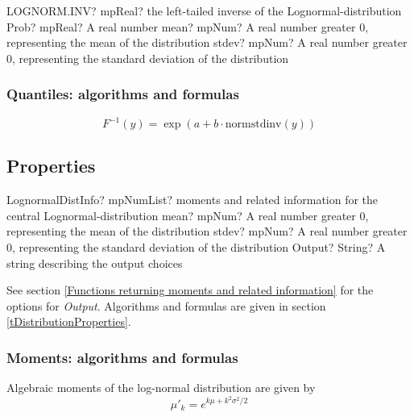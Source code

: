 \vspace{0.6cm}
\begin{mpFunctionsExtract}
	\mpWorksheetFunctionThreeNotImplemented
	{LOGNORM.INV? mpReal? the left-tailed inverse of the Lognormal-distribution}
	{Prob? mpReal? A real number}
	{mean? mpNum? A real number greater 0, representing the mean of the distribution}
	{stdev? mpNum? A real number greater 0, representing the standard deviation of the distribution}
\end{mpFunctionsExtract}


\subsubsection{Quantiles: algorithms and formulas}

\begin{equation} 
	F^{-1}(y)= \exp(a+b \cdot \text{normstdinv}(y))
\end{equation}



\subsection{Properties}
\label{LognormalDistributionProperties}


\begin{mpFunctionsExtract}
	\mpFunctionThreeNotImplemented
	{LognormalDistInfo? mpNumList? moments and related information for the central Lognormal-distribution}
	{mean? mpNum? A real number greater 0, representing the mean of the distribution}
	{stdev? mpNum? A real number greater 0, representing the standard deviation of the distribution}
	{Output? String? A string describing the output choices}
\end{mpFunctionsExtract}

\vspace{0.3cm}

See section \ref{Functions returning moments and related information} for the options for {\itshape\sffamily Output}. Algorithms and formulas are given in section \ref{tDistributionProperties}.




\subsubsection{Moments: algorithms and formulas}
Algebraic moments of the log-normal distribution are given by
\begin{equation} 
	\mu'_k= e^{k\mu+k^2\sigma^2 /2}
\end{equation}


